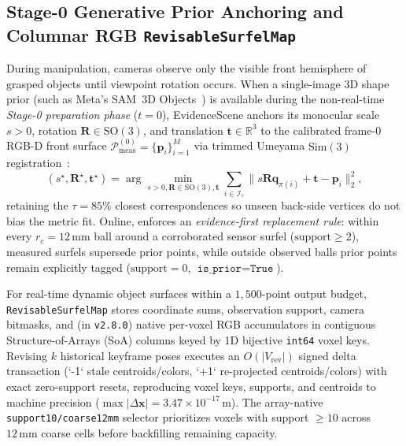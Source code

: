 \documentclass{evidencescene}
\begin{document}
\subsection{Stage-0 Generative Prior Anchoring and Columnar RGB \texttt{RevisableSurfelMap}}
\label{sec:surface_selection}
During manipulation, cameras observe only the visible front hemisphere of grasped objects until viewpoint rotation occurs. When a single-image 3D shape prior (such as Meta's SAM~3D Objects~\cite{sam3d2025}) is available during the non-real-time \emph{Stage-0 preparation phase} ($t=0$), EvidenceScene anchors its monocular scale $s>0$, rotation $\mathbf{R}\in\mathrm{SO}(3)$, and translation $\mathbf{t}\in\mathbb{R}^3$ to the calibrated frame-$0$ RGB-D front surface $\mathcal{P}_{\mathrm{meas}}^{(0)}=\{\mathbf{p}_i\}_{i=1}^M$ via trimmed Umeyama $\mathrm{Sim}(3)$ registration~\cite{umeyama1991least}:
\begin{equation}
    (s^\star,\mathbf{R}^\star,\mathbf{t}^\star)=\arg\min_{s>0,\mathbf{R}\in\mathrm{SO}(3),\mathbf{t}}\sum_{i\in\mathcal{I}_{\tau}}\bigl\|s\mathbf{R}\mathbf{q}_{\pi(i)}+\mathbf{t}-\mathbf{p}_i\bigr\|_2^2,
    \label{eq:sim3_prior_anchor}
\end{equation}
retaining the $\tau=85\%$ closest correspondences so unseen back-side vertices do not bias the metric fit. Online,  enforces an \emph{evidence-first replacement rule}: within every $r_c=12\,\mathrm{mm}$ ball around a corroborated sensor surfel ($\text{support}\ge 2$), measured surfels supersede prior points, while outside observed balls prior points remain explicitly tagged ($\text{support}=0$, $\texttt{is\_prior}=\texttt{True}$).

For real-time dynamic object surfaces within a $1{,}500$-point output budget, \texttt{RevisableSurfelMap} stores coordinate sums, observation support, camera bitmasks, and (in \texttt{v2.8.0}) native per-voxel RGB accumulators in contiguous Structure-of-Arrays (SoA) columns keyed by 1D bijective \texttt{int64} voxel keys. Revising $k$ historical keyframe poses executes an $O(|V_{\mathrm{rev}}|)$ signed delta transaction (`-1` stale centroids/colors, `+1` re-projected centroids/colors) with exact zero-support resets, reproducing voxel keys, supports, and centroids to machine precision ($\max|\Delta\mathbf{x}|=3.47\times 10^{-17}\,\mathrm{m}$). The array-native \texttt{support10/coarse12mm} selector prioritizes voxels with support $\ge 10$ across $12\,\mathrm{mm}$ coarse cells before backfilling remaining capacity.
\end{document}
